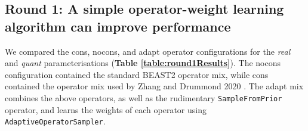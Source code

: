 \documentclass[10pt,letterpaper]{article}
\begin{document}
\clearpage
\subsection*{Round 1: A simple operator-weight learning algorithm can improve performance}

We compared the cons, nocons, and adapt operator configurations for the \textit{real} and \textit{quant} parameterisations (\textbf{Table \ref{table:round1Results}}).
The nocons configuration contained the standard BEAST2 operator mix, while cons contained the operator mix used by Zhang and Drummond 2020 \cite{zhang2020improving}. 
The adapt mix combines the above operators, as well as the rudimentary \texttt{SampleFromPrior} operator, and learns the weights of each operator using  \texttt{AdaptiveOperatorSampler}.
\end{document}
